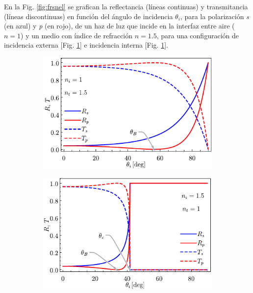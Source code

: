 En la Fig. \ref{fig:frsnel} se grafican la reflectancia (líneas continuas) y transmitancia (líneas discontinuas) en función del ángulo de incidencia $\theta_i$, para la polarización \emph{s} (en azul) y \emph{p} (en rojo), de un haz de luz que incide en la interfaz entre aire ($n=1$) y un medio con índice de refracción $n=1.5$, para una configuración de incidencia externa [Fig. \ref{sfig:frsnelExt}] e incidencia interna [Fig. \ref{sfig:frsnelExt}].
%
\begin{figure}[h!]\centering\hspace*{-1.5em}
	\begin{subfigure}{.05\textwidth}\vspace{-4.5cm}\caption{}\label{sfig:frsnelExt}\end{subfigure}
	\begin{subfigure}{.43\textwidth} \hspace*{-.7cm}
	\includegraphics[scale=1]{1-Teoria/figs/1-2-FrsnelExt}
	\end{subfigure}
	\begin{subfigure}{.05\textwidth}\vspace{-4.5cm}\caption{}\label{sfig:frsenlInt}\end{subfigure}
	\begin{subfigure}{.43\textwidth} \hspace*{-.7cm}
	\includegraphics[scale=1]{1-Teoria/figs/1-2-FrsnelInt}

\end{subfigure}
\end{figure}
